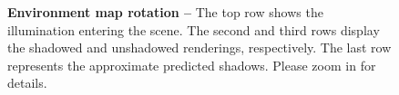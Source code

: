 \begin{figure}[!t]
  \centering
  \rotatingfigure
  \caption[Novel lightning synthesis capabilities of \lumigauss under an environment map rotation]{\textbf{Environment map rotation --}
    The top row shows the illumination entering the scene.
    The second and third rows display the shadowed and unshadowed renderings,
    respectively.
    The last row represents the approximate predicted shadows.
    Please zoom in for details.
  }
  \label{fig:lumigauss-rotate_light}
\end{figure}
